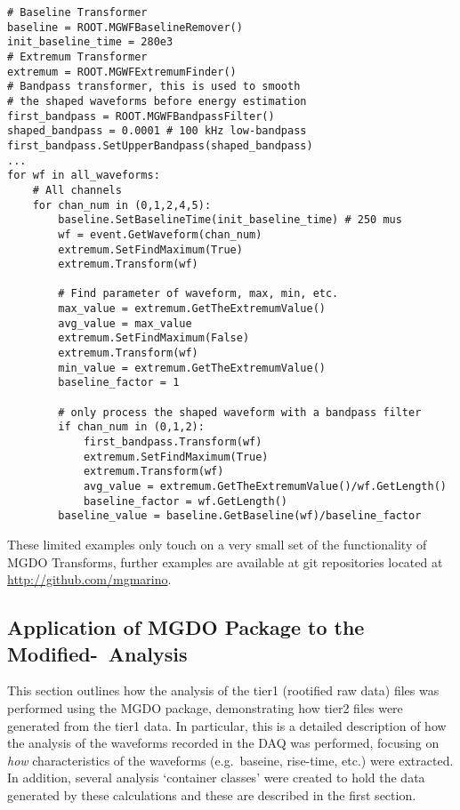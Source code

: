 	\lstset{
	   language=Python}			
			\begin{lstlisting}[caption=Calculating general waveform characteristics in Python]			
# Baseline Transformer
baseline = ROOT.MGWFBaselineRemover()
init_baseline_time = 280e3
# Extremum Transformer
extremum = ROOT.MGWFExtremumFinder()
# Bandpass transformer, this is used to smooth
# the shaped waveforms before energy estimation 
first_bandpass = ROOT.MGWFBandpassFilter()
shaped_bandpass = 0.0001 # 100 kHz low-bandpass
first_bandpass.SetUpperBandpass(shaped_bandpass)
...
for wf in all_waveforms:
    # All channels
    for chan_num in (0,1,2,4,5):
        baseline.SetBaselineTime(init_baseline_time) # 250 mus
        wf = event.GetWaveform(chan_num)
        extremum.SetFindMaximum(True)
        extremum.Transform(wf)

        # Find parameter of waveform, max, min, etc.
        max_value = extremum.GetTheExtremumValue()
        avg_value = max_value
        extremum.SetFindMaximum(False)
        extremum.Transform(wf)
        min_value = extremum.GetTheExtremumValue()
        baseline_factor = 1

        # only process the shaped waveform with a bandpass filter
        if chan_num in (0,1,2):
            first_bandpass.Transform(wf)
            extremum.SetFindMaximum(True)
            extremum.Transform(wf)
            avg_value = extremum.GetTheExtremumValue()/wf.GetLength()
            baseline_factor = wf.GetLength()
        baseline_value = baseline.GetBaseline(wf)/baseline_factor
			\end{lstlisting}	

These limited examples only touch on a very small set of the functionality of MGDO Transforms, further examples are available at git repositories located at \url{http://github.com/mgmarino}.
	
		\subsection{Application of MGDO Package to the Modified-\bege~Analysis}
		
This section outlines how the analysis of the tier1 (rootified raw data) files was performed using the MGDO package, demonstrating how tier2 files were generated from the tier1 data.  In particular, this is a detailed description of how the analysis of the waveforms recorded in the DAQ was performed, focusing on \emph{how} characteristics of the waveforms (e.g.~baseine, rise-time, etc.) were extracted.  In addition, several analysis `container classes' were created to hold the data generated by these calculations and these are described in the first section.  
